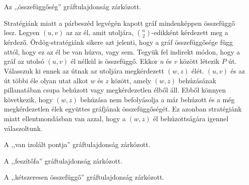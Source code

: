 \begin{Exercise}[counter={sorszam}, difficulty=0]
Az ,,összefüggőség'' gráftulajdonság zárkózott.


\end{Exercise}

\begin{Answer}
 Stratégiánk miatt a párbeszéd legvégén kapott gráf mindenképpen összefüggő lesz. Legyen $(u,v)$ az az él, amit utoljára, $\binom{n}{2}$-edikként  kérdezett meg a kérdező. Ördög-stratégiánk sikere azt jelenti, hogy a gráf összefüggősége függ attól, hogy ez az él be van húzva, vagy sem. Tegyük fel indirekt módon, hogy a gráf az utolsó $(u,v)$ él nélkül is összefüggő. Ekkor $u$ és $v$ között létezik $P$ út. Válasszuk ki ennek az útnak az utoljára megkérdezett $(w,z)$ élét. $(u,v)$ és az út többi éle olyan utat alkot $w$ és $z$ között, amely $(w,z)$ behúzásának pillanatában csupa behúzott vagy megkérdezetlen élből áll. Ebből könnyen következik, hogy $(w,z)$ behúzása nem befolyásolja a már behúzott és a még megkérdezetlen élek együttes gráfjának összefüggőségét. Ez azonban stratégiánk miatt ellentmondásban van azzal, hogy a $(w,z)$ él behúzottságára igennel válaszoltunk.
\end{Answer}


\begin{Exercise}[counter={sorszam}, difficulty=2]
A ,,van izolált pontja'' gráftulajdonság zárkózott.
\end{Exercise}



\begin{Exercise}[counter={sorszam}, difficulty=0]
A ,,feszítőfa'' gráftulajdonság zárkózott.
\end{Exercise}


\begin{Exercise}[counter={sorszam}, difficulty=0]
A ,,kétszeresen összefüggő'' gráftulajdonság zárkózott.
\end{Exercise}



